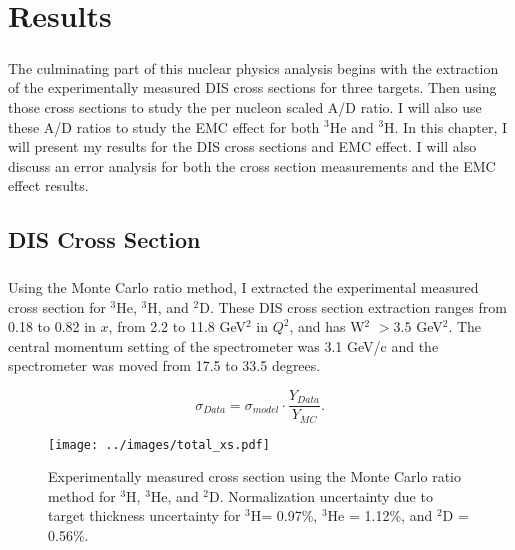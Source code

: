 
\chapter{Results}
\paragraph{}The culminating part of this nuclear physics analysis begins with the extraction of the experimentally measured DIS cross sections for three targets. Then using those cross sections to study the per nucleon scaled A/D ratio. I will also use these A/D ratios to study the EMC effect for both $^3$He and $^3$H. In this chapter, I will present my results for the DIS cross sections and EMC effect. I will also discuss an error analysis for both the cross section measurements and the EMC effect results. 
\section{DIS Cross Section}
\paragraph{}Using the Monte Carlo ratio method, I extracted the experimental measured cross section for $^3$He, $^3$H, and $^2$D. These DIS cross section extraction ranges from 0.18 to 0.82 in $x$, from 2.2 to 11.8 GeV$^2$ in $Q^2$, and has W$^2$ $>3.5$ GeV$^2$. The central momentum setting of the spectrometer was 3.1 GeV/c and the spectrometer was moved from 17.5 to 33.5 degrees.


\begin{equation}
\sigma_{Data} = \sigma_{model} \cdot \frac{Y_{Data}}{Y_{MC}}. \nonumber
\end{equation}

\begin{figure}
	\hspace{-20pt}
	\texttt{[image: ../images/total\_xs.pdf]}
	\caption{Experimentally measured cross section using the Monte Carlo ratio method for $^3$H, $^3$He, and $^2$D. Normalization uncertainty due to target thickness uncertainty for $^3$H= 0.97\%, $^3$He = 1.12\%, and $^2$D = 0.56\%.}
    \label{CCplot}
\end{figure}

